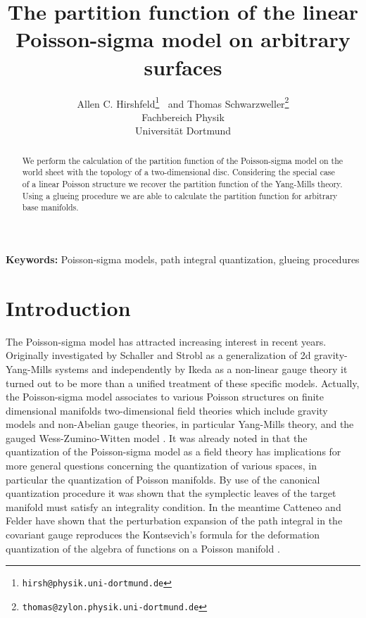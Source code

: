 \documentclass[a4paper,twoside,11pt]{article}
\title{The partition function of the linear Poisson-sigma model on arbitrary surfaces}
\author{ Allen C. Hirshfeld\footnote{\tt hirsh@physik.uni-dortmund.de}$\;\;$ and Thomas 
Schwarzweller\footnote{\tt thomas@zylon.physik.uni-dortmund.de}\\Fachbereich Physik\\Universit\"at Dortmund}
\numberwithin{equation}{section}
\begin{document}
%
%
\newcommand{\sss}{\scriptscriptstyle}
\newcommand{\mc}{\mathcal}
\newcommand{\bmult}{\begin{multline}}
\newcommand{\emult}{\end{multline}}
\newcommand{\rd}{\mathrm d}
\newcommand{\Vol}{\text{Vol}}
%
%
\pagestyle{fancy}
\lhead{}
\rhead{}
\renewcommand{\headrulewidth}{0.3pt}
\renewcommand{\footrulewidth}{0pt}
%
%
\maketitle
\begin{abstract}
We perform the calculation of the  partition function of the Poisson-sigma model on the world sheet with 
the topology of a two-dimensional disc. Considering the special case of a linear Poisson structure we recover the partition function of the Yang-Mills theory. Using a glueing procedure we are able to 
calculate the partition function for arbitrary base manifolds.
\end{abstract}
%
%
%
{\bf Keywords:} Poisson-sigma models, path integral quantization, glueing procedures
%
\section{Introduction}
%
The Poisson-sigma model has attracted increasing interest in recent years. Originally investigated  by Schaller and Strobl as a 
generalization of 2d gravity-Yang-Mills systems \cite{SS} and independently by Ikeda as a non-linear gauge theory \cite{I} it turned out 
to be more than a unified  treatment of these specific models. 
Actually, the Poisson-sigma model  associates to various Poisson structures on finite dimensional manifolds two-dimensional 
field theories which include gravity models \cite{TS,KS,EKS}  and non-Abelian gauge theories, in particular Yang-Mills theory, and the 
gauged Wess-Zumino-Witten model \cite{ASS}. 
It was already noted in \cite{SS,SS2} that the quantization of the Poisson-sigma model as a field theory
has implications for more general questions concerning the quantization of various spaces, in particular
the quantization of Poisson 
manifolds. By use of the canonical quantization procedure it was shown that the symplectic leaves of the target manifold must satisfy 
an integrality condition. In the meantime 
Catteneo and Felder \cite{CF1} have shown that the perturbation expansion of the path integral in the covariant gauge 
reproduces the Kontsevich's formula for the deformation quantization of the algebra of functions on a Poisson manifold \cite{K}. 
\end{document}
